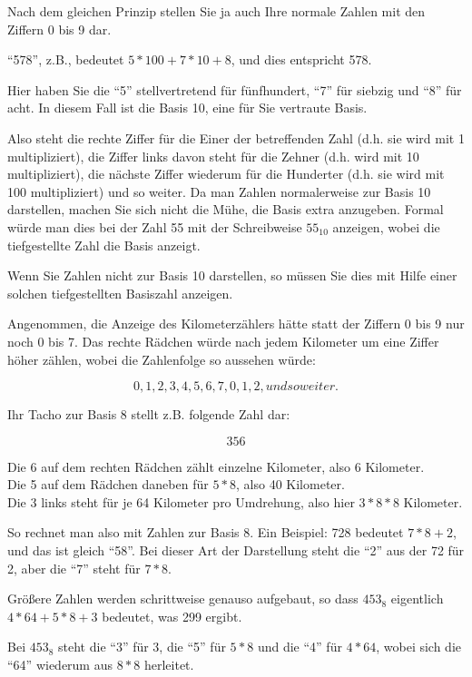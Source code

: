 \documentclass[a4paper,11pt, oneside,openright,titlepage,dvips]{scrbook}
\begin{document}
Nach dem gleichen Prinzip stellen Sie ja auch Ihre normale Zahlen
mit den Ziffern 0 bis 9 dar.

"`578"', z.B., bedeutet $5 * 100 + 7 * 10 + 8$, und dies
entspricht 578.

Hier haben Sie die "`5"' stellvertretend für fünfhundert, "`7"' für
siebzig und "`8"' für acht. In diesem Fall ist die Basis 10, eine für
Sie vertraute Basis.

Also steht die rechte Ziffer für die Einer der betreffenden Zahl (d.h.
sie wird mit 1 multipliziert), die Ziffer links davon steht für die
Zehner (d.h. wird mit 10 multipliziert), die nächste Ziffer wiederum
für die Hunderter (d.h. sie wird mit 100 multipliziert) und so weiter.
Da man Zahlen normalerweise zur Basis 10 darstellen, machen Sie sich
nicht die Mühe, die Basis extra anzugeben. Formal würde man dies bei
der Zahl 55 mit der Schreibweise $55_{10}$ anzeigen, wobei die
tiefgestellte Zahl die Basis anzeigt.

Wenn Sie Zahlen nicht zur Basis 10 darstellen, so müssen Sie dies mit Hilfe
einer solchen tiefgestellten Basiszahl anzeigen.


Angenommen, die Anzeige des Kilometerzählers hätte statt der Ziffern 0
bis 9 nur noch 0 bis 7. Das rechte Rädchen würde nach jedem Kilometer
um eine Ziffer höher zählen, wobei die Zahlenfolge so aussehen würde:

\[ 0, 1, 2, 3, 4, 5, 6, 7, 0, 1, 2, und so weiter. \]

Ihr Tacho zur Basis 8 stellt z.B. folgende Zahl dar:

\[ 356 \]

Die 6 auf dem rechten Rädchen zählt einzelne Kilometer, also 6
Kilometer.\\
Die 5 auf dem Rädchen daneben für $5 * 8$, also 40 Kilometer.\\
Die 3 links steht für je 64 Kilometer pro Umdrehung, also hier
$3 * 8 * 8$ Kilometer.

So rechnet man also mit Zahlen zur Basis 8. Ein Beispiel: 728 bedeutet
$7 * 8 + 2$, und das ist gleich "`58"'. Bei dieser Art der Darstellung
steht die "`2"' aus der 72 für 2, aber die "`7"' steht für $7 * 8$.

Größere Zahlen werden schrittweise genauso aufgebaut, so dass
$453_8$ eigentlich $4 * 64 + 5 * 8 + 3$ bedeutet, was 299 ergibt.

Bei $453_8$ steht die "`3"' für 3, die "`5"' für $5 * 8$ und die "`4"'
für $4 * 64$, wobei sich die "`64"' wiederum aus $8 * 8$ herleitet.
\end{document}
